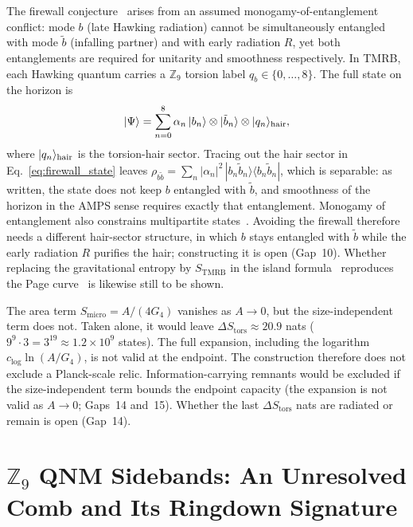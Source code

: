 \documentclass[11pt,a4paper]{article}
\begin{document}
The firewall conjecture~\cite{AMPS2013} arises from an assumed monogamy-of-entanglement
conflict: mode $b$ (late Hawking radiation) cannot be simultaneously entangled
with mode $\tilde{b}$ (infalling partner) and with early radiation $R$, yet both
entanglements are required for unitarity and smoothness respectively.  In TMRB,
each Hawking quantum carries a $\mathbb{Z}_9$ torsion label $q_b \in \{0,\ldots,8\}$.
The full state on the horizon is
\begin{equation}
  |\Psi\rangle = \sum_{n=0}^{8} \alpha_n\,|b_n\rangle \otimes |\tilde{b}_n\rangle \otimes |q_n\rangle_{\rm hair},
  \label{eq:firewall_state}
\end{equation}
where $|q_n\rangle_{\rm hair}$ is the torsion-hair sector.  Tracing out the hair sector in Eq.~\eqref{eq:firewall_state} leaves
$\rho_{b\tilde b} = \sum_n |\alpha_n|^2\, |b_n\tilde b_n\rangle\langle b_n\tilde b_n|$,
which is separable: as written, the state does not keep $b$ entangled with
$\tilde b$, and smoothness of the horizon in the AMPS sense requires exactly that
entanglement.  Monogamy of entanglement also constrains multipartite
states~\cite{CKW2000}.  Avoiding the firewall therefore needs a different
hair-sector structure, in which $b$ stays entangled with $\tilde b$ while the
early radiation $R$ purifies the hair; constructing it is open (Gap~10).
Whether replacing the gravitational entropy by $S_{\mathrm{TMRB}}$ in the island
formula~\cite{Penington2020} reproduces the Page curve~\cite{Page1993} is
likewise still to be shown.

The area term $S_{\mathrm{micro}} = A/(4G_4)$ vanishes as $A\to 0$, but the
size-independent term does not. Taken alone, it would leave
$\Delta S_{\mathrm{tors}} \approx 20.9$ nats ($9^9\cdot 3 = 3^{19} \approx 1.2\times10^{9}$ states).
The full expansion, including the logarithm $c_{\log}\ln(A/G_4)$, is not valid at the endpoint.
The construction therefore does not exclude a Planck-scale relic. Information-carrying remnants would be excluded if the size-independent term bounds the endpoint capacity (the expansion is not valid as $A\to 0$; Gaps~14 and~15). Whether the last $\Delta S_{\mathrm{tors}}$
nats are radiated or remain is open (Gap~14).

\section{$\mathbb{Z}_9$ QNM Sidebands: An Unresolved Comb and Its Ringdown Signature}
\label{sec:fluid_gravity}
\end{document}
